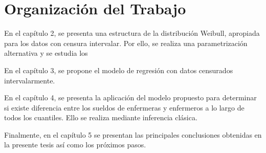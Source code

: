 \section{Organización del Trabajo}

En el capítulo 2, se presenta una estructura de la distribución Weibull, apropiada para los datos con censura intervalar. Por ello, se realiza una parametrización alternativa y se estudia los 

En el capítulo 3, se propone el modelo de regresión con datos censurados intervalarmente.

En el capítulo 4, se presenta la aplicación del modelo propuesto para determinar si existe diferencia entre los sueldos de enfermeras y enfermeros a lo largo de todos los cuantiles. Ello se realiza mediante inferencia clásica.

Finalmente, en el capítulo 5 se presentan las principales conclusiones obtenidas en la presente tesis así como los próximos pasos.
